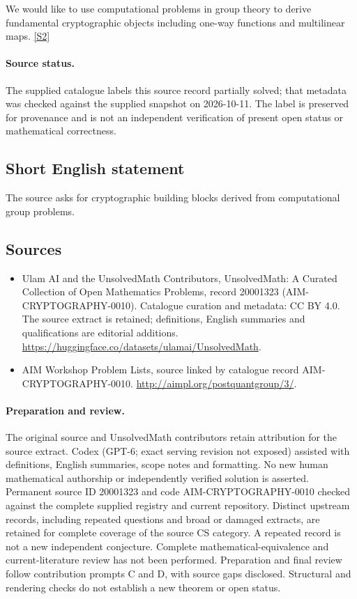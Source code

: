 \documentclass[11pt]{article}
\newcommand{\sref}[2]{\hyperlink{source:#1:#2}{[S#2]}}
\begin{document}
We would like to use computational problems in group theory to derive fundamental cryptographic objects including one-way functions and multilinear maps. \sref{20001323}{2}
\paragraph{Source status.}
The supplied catalogue labels this source record partially solved; that metadata was checked against the supplied snapshot on 2026-10-11. The label is preserved for provenance and is not an independent verification of present open status or mathematical correctness.
\subsection{Short English statement}
The source asks for cryptographic building blocks derived from computational group problems.
\subsection{Sources}
\begin{itemize}
\item[\hypertarget{source:20001323:1}{S1}] Ulam AI and the UnsolvedMath Contributors, UnsolvedMath: A Curated Collection of Open Mathematics Problems, record 20001323 (AIM-CRYPTOGRAPHY-0010). Catalogue curation and metadata: CC BY 4.0. The source extract is retained; definitions, English summaries and qualifications are editorial additions.
\url{https://huggingface.co/datasets/ulamai/UnsolvedMath}.
\item[\hypertarget{source:20001323:2}{S2}] AIM Workshop Problem Lists, source linked by catalogue record AIM-CRYPTOGRAPHY-0010.
\url{http://aimpl.org/postquantgroup/3/}.
\end{itemize}
\paragraph{Preparation and review.}
The original source and UnsolvedMath contributors retain attribution for the source extract. Codex (GPT-6; exact serving revision not exposed) assisted with definitions, English summaries, scope notes and formatting. No new human mathematical authorship or independently verified solution is asserted. Permanent source ID 20001323 and code AIM-CRYPTOGRAPHY-0010 checked against the complete supplied registry and current repository. Distinct upstream records, including repeated questions and broad or damaged extracts, are retained for complete coverage of the source CS category. A repeated record is not a new independent conjecture. Complete mathematical-equivalence and current-literature review has not been performed. Preparation and final review follow contribution prompts C and D, with source gaps disclosed. Structural and rendering checks do not establish a new theorem or open status.
\label{end:20001323}
\end{document}
